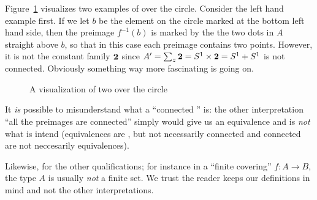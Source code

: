  Figure~\ref{fig:covering} visualizes two examples of \coverings over the circle.  
Consider the left hand example first.  
If we let $b$ be the element on the circle marked at the bottom left hand side, then the preimage $f^{-1}(b)$ is marked by the the two dots in $A$ straight above $b$, so that in this case each preimage contains two points.  
However, it is not the constant family $\mathbf{2}$ since $A'=\sum_{z}\mathbf{2}=S^1\times\mathbf{2}=S^1+S^1$ is not connected.  
Obviously something way more fascinating is going on.
\begin{figure}
  \centering
  \caption{A visualization of two \coverings over the circle}
  \label{fig:covering}
\end{figure}

\begin{remark}
  It \emph{is} possible to misunderstand what a ``connected \covering'' is: the other interpretation ``all the preimages are connected'' simply would give us an equivalence and is \emph{not} what is intend (equivalences are \coverings, but not necessarily connected \coverings and connected \coverings are not neccesarily equivalences).  

Likewise, for the other qualifications; for instance in a ``finite covering'' $f:A\to B$, the type $A$ is usually \emph{not} a finite set. %
  We trust the reader keeps our definitions in mind and not the other interpretations.
\end{remark}

